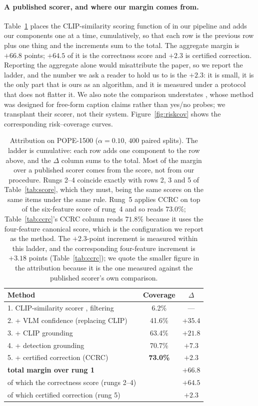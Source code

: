 \documentclass{article}
\theoremstyle{plain}
\theoremstyle{definition}
\theoremstyle{remark}
\begin{document}
\paragraph{A published scorer, and where our margin comes from.}
Table~\ref{tab:attrib} places the CLIP-similarity scoring function of \citet{conflvlm} in our
pipeline and adds our components one at a time, cumulatively, so that each row is the previous
row plus one thing and the increments sum to the total. The aggregate margin is $+66.8$ points;
$+64.5$ of it is the correctness score and $+2.3$ is certified correction. Reporting the
aggregate alone would misattribute the paper, so we report the ladder, and the number we ask a
reader to hold us to is the $+2.3$: it is small, it is the only part that is ours as an
algorithm, and it is measured under a protocol that does not flatter it. We also note the
comparison understates
\citet{conflvlm}, whose method was designed for free-form caption claims rather than yes/no
probes; we transplant their scorer, not their system.
Figure~\ref{fig:riskcov} shows the corresponding risk--coverage curves.

\begin{table}[t]
\centering
\caption{Attribution on POPE-1500 ($\alpha=0.10$, $400$ paired splits). The ladder is cumulative:
each row adds one component to the row above, and the $\Delta$ column sums to the total. Most of
the margin over a published scorer comes from the score, not from our procedure. Rungs 2--4
coincide exactly with rows 2, 3 and 5 of Table~\ref{tab:score}, which they must, being the same
scores on the same items under the same rule. Rung~5 applies CCRC on top of the six-feature score
of rung~4 and so reads $73.0\%$; Table~\ref{tab:ccrc}'s CCRC column reads $71.8\%$ because it uses
the four-feature canonical score, which is the configuration we report as the method. The
$+2.3$-point increment is measured within this ladder, and the corresponding four-feature
increment is $+3.18$ points (Table~\ref{tab:ccrc}); we quote the smaller figure in the
attribution because it is the one measured against the published scorer's own comparison.}
\label{tab:attrib}
\begin{tabular}{lcc}
\toprule
Method & Coverage & $\Delta$\\
\midrule
1. CLIP-similarity scorer \citep{conflvlm}, filtering & \phantom{0}6.2\%  & ---\\
2. \quad + VLM confidence (replacing CLIP)         & 41.6\% & $+35.4$\\
3. \quad + CLIP grounding                          & 63.4\% & $+21.8$\\
4. \quad + detection grounding                     & 70.7\% & $+7.3$\\
5. \quad + certified correction (CCRC)             & \textbf{73.0\%} & $+2.3$\\
\midrule
\textbf{total margin over rung 1}                  & & $\mathbf{+66.8}$\\
\quad of which the correctness score (rungs 2--4)  & & $+64.5$\\
\quad of which certified correction (rung 5)       & & $+2.3$\\
\bottomrule
\end{tabular}
\end{table}
\end{document}
